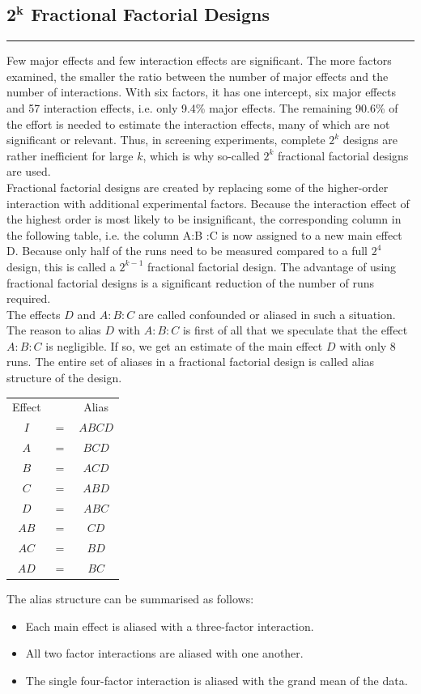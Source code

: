\subsection{$\mathbf{2^k}$ Fractional Factorial Designs}
\noindent\rule[\linienAbstand]{\linewidth}{\linienDicke}
Few major effects and few interaction effects are significant. The more factors examined, the smaller the ratio between the number of major effects and the number of interactions. With six factors, it has one intercept, six major effects and 57 interaction effects, i.e. only 9.4\% major effects. The remaining 90.6\% of the effort is needed to estimate the interaction effects, many of which are not significant or relevant. Thus, in screening experiments, complete $2^k$ designs are rather inefficient for large $k$, which is why so-called $2^k$ fractional factorial designs are used.\\

Fractional factorial designs are created by replacing some of the higher-order interaction with additional experimental factors. Because the interaction effect of the highest order is most likely to be insignificant, the corresponding column in the following table, i.e. the column A:B :C
is now assigned to a new main effect D.
Because only half of the runs need to be measured compared to a full $2^4$ design, this is called a $2^{k-1}$ fractional factorial design. The advantage of using fractional factorial designs is a significant reduction of the number of runs required.\\

The effects $D$ and $A:B:C$ are called confounded or aliased in such a situation. The reason to alias $D$ with $A:B:C$ is first of all that we speculate that the effect $A:B:C$ is negligible. If so, we get an estimate of the main effect $D$ with only 8 runs.
The entire set of aliases in a fractional factorial design is called alias structure of the design.

\begin{table}[H]
  \centering
  \scriptsize
  \begin{tabular}{ccc}
    Effect & & Alias \\
    $I$  & $=$ & $ABCD$  \\
    $A$  & $=$ & $BCD$   \\
    $B$  & $=$ & $ACD$   \\
    $C$  & $=$ & $ABD$   \\
    $D$  & $=$ & $ABC$   \\
    $AB$ & $=$ & $CD$    \\
    $AC$ & $=$ & $BD$    \\
    $AD$ & $=$ & $BC$    \\
  \end{tabular}
\end{table}
The alias structure can be summarised as follows:
\begin{itemize}
  \item Each main effect is aliased with a three-factor interaction.
  \item All two factor interactions are aliased with one another.
  \item The single four-factor interaction is aliased with the grand mean of the data.
\end{itemize}
